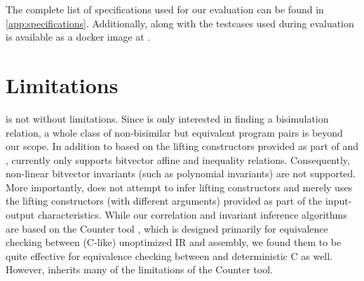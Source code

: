 The complete list of specifications used for our evaluation can be found in \cref{app:specifications}.
Additionally, \toolName{} along with the testcases used during evaluation is available as a docker image
at \cite{s2c_docker}.


\section{Limitations}
\label{sec:limitations}

\toolName{} is not without limitations.
Since \toolName{} is only interested in finding a bisimulation relation,
a whole class of non-bisimilar but equivalent program pairs is beyond our scope.
In addition to \recursiveRelations{} based on the lifting constructors provided as part of \pre{} and \post{},
\toolName{} currently only supports bitvector affine and inequality relations.
Consequently, non-linear bitvector invariants (such as polynomial invariants) are not supported.
More importantly, \toolName{} does not attempt to infer lifting constructors and merely
uses the lifting constructors (with different arguments) provided as part of the input-output characteristics.
While our correlation and invariant inference algorithms are based on the Counter tool \cite{oopsla20},
which is designed primarily for equivalence checking between (C-like) unoptimized IR and assembly, we found them to be
quite effective for equivalence checking between \SpecL{} and deterministic C as well.
However, \toolName{} inherits many of the limitations of the Counter tool.

